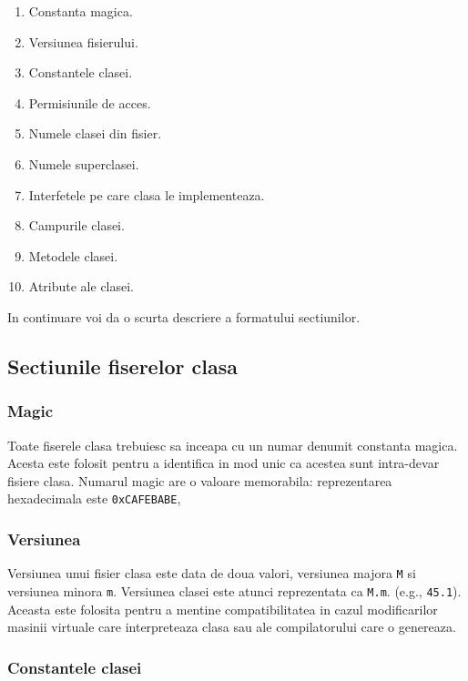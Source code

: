 \documentclass[]{article}
\providecommand{\tightlist}{%
  \setlength{\itemsep}{0pt}\setlength{\parskip}{0pt}}
\begin{document}
\begin{enumerate}
	\def\labelenumi{\arabic{enumi}.}
	\tightlist
	\item
	      Constanta magica.
	\item
	      Versiunea fisierului.
	\item
	      Constantele clasei.
	\item
	      Permisiunile de acces.
	\item
	      Numele clasei din fisier.
	\item
	      Numele superclasei.
	\item
	      Interfetele pe care clasa le implementeaza.
	\item
	      Campurile clasei.
	\item
	      Metodele clasei.
	\item
	      Atribute ale clasei.
\end{enumerate}

In continuare voi da o scurta descriere a formatului sectiunilor.

\subsection{Sectiunile fiserelor
	clasa}\label{sectiunile-fiserelor-clasa}

\subsubsection{Magic}\label{magic}

Toate fiserele clasa trebuiesc sa inceapa cu un numar denumit constanta
magica. Acesta este folosit pentru a identifica in mod unic ca acestea
sunt intra-devar fisiere clasa. Numarul magic are o valoare memorabila:
reprezentarea hexadecimala este \texttt{0xCAFEBABE},

\subsubsection{Versiunea}\label{versiunea}

Versiunea unui fisier clasa este data de doua valori, versiunea majora
\texttt{M} si versiunea minora \texttt{m}. Versiunea clasei este atunci
reprezentata ca \texttt{M.m}. (e.g., \texttt{45.1}). Aceasta este
folosita pentru a mentine compatibilitatea in cazul modificarilor
masinii virtuale care interpreteaza clasa sau ale compilatorului care o
genereaza.

\subsubsection{Constantele clasei}\label{constantele-clasei}
\end{document}
